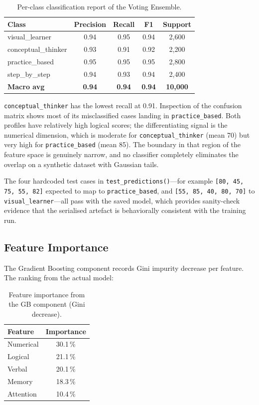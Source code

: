\documentclass[12pt,a4paper]{article}
\begin{document}
\begin{table}[H]
  \centering
  \caption{Per-class classification report of the Voting Ensemble.}
  \begin{tabular}{lcccc}
    \toprule
    \textbf{Class} & \textbf{Precision} & \textbf{Recall}
    & \textbf{F1} & \textbf{Support} \\
    \midrule
    visual\_learner      & 0.94 & 0.95 & 0.94 & 2,600 \\
    conceptual\_thinker  & 0.93 & 0.91 & 0.92 & 2,200 \\
    practice\_based      & 0.95 & 0.95 & 0.95 & 2,800 \\
    step\_by\_step       & 0.94 & 0.93 & 0.94 & 2,400 \\
    \midrule
    \textbf{Macro avg}   & \textbf{0.94} & \textbf{0.94}
    & \textbf{0.94} & \textbf{10,000} \\
    \bottomrule
  \end{tabular}
\end{table}

\texttt{conceptual\_thinker} has the lowest recall at 0.91.
Inspection of the confusion matrix shows most of its misclassified
cases landing in \texttt{practice\_based}. Both profiles have
relatively high logical scores; the differentiating signal is the
numerical dimension, which is moderate for
\texttt{conceptual\_thinker} (mean 70) but very high for
\texttt{practice\_based} (mean 85). The boundary in that region
of the feature space is genuinely narrow, and no classifier
completely eliminates the overlap on a synthetic dataset with
Gaussian tails.

The four hardcoded test cases in \texttt{test\_predictions()}---for
example \texttt{[80, 45, 75, 55, 82]} expected to map to
\texttt{practice\_based}, and \texttt{[55, 85, 40, 80, 70]}
to \texttt{visual\_learner}---all pass with the saved model, which
provides sanity-check evidence that the serialised artefact is
behaviorally consistent with the training run.

\subsection{Feature Importance}

The Gradient Boosting component records Gini impurity decrease
per feature. The ranking from the actual model:

\begin{table}[H]
  \centering
  \caption{Feature importance from the GB component (Gini decrease).}
  \begin{tabular}{lc}
    \toprule
    \textbf{Feature} & \textbf{Importance} \\
    \midrule
    Numerical  & 30.1\,\% \\
    Logical    & 21.1\,\% \\
    Verbal     & 20.1\,\% \\
    Memory     & 18.3\,\% \\
    Attention  & 10.4\,\% \\
    \bottomrule
  \end{tabular}
\end{table}
\end{document}
